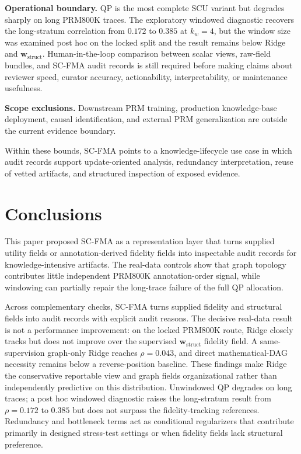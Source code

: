 \documentclass[pdflatex,sn-mathphys-num,iicol]{sn-jnl}
\newcommand{\wstruct}{\ensuremath{\mathbf{w}_{\mathrm{struct}}}}
\begin{document}
\textbf{Operational boundary.} QP is the most complete SCU variant but degrades sharply on long PRM800K traces. The exploratory windowed diagnostic recovers the long-stratum correlation from $0.172$ to $0.385$ at $k_w=4$, but the window size was examined post hoc on the locked split and the result remains below Ridge and \wstruct{}. Human-in-the-loop comparison between scalar views, raw-field bundles, and SC-FMA audit records is still required before making claims about reviewer speed, curator accuracy, actionability, interpretability, or maintenance usefulness.

\medskip
\noindent\textbf{Scope exclusions.} Downstream PRM training, production knowledge-base deployment, causal identification, and external PRM generalization are outside the current evidence boundary.

\noindent Within these bounds, SC-FMA points to a knowledge-lifecycle use case in which audit records support update-oriented analysis, redundancy interpretation, reuse of vetted artifacts, and structured inspection of exposed evidence.

\section{Conclusions}
\label{sec:conclusions}

This paper proposed SC-FMA as a representation layer that turns supplied utility fields or annotation-derived fidelity fields into inspectable audit records for knowledge-intensive artifacts. The real-data controls show that graph topology contributes little independent PRM800K annotation-order signal, while windowing can partially repair the long-trace failure of the full QP allocation.

Across complementary checks, SC-FMA turns supplied fidelity and structural fields into audit records with explicit audit reasons. The decisive real-data result is not a performance improvement: on the locked PRM800K route, Ridge closely tracks but does not improve over the supervised \wstruct{} fidelity field. A same-supervision graph-only Ridge reaches $\rho=0.043$, and direct mathematical-DAG necessity remains below a reverse-position baseline. These findings make Ridge the conservative reportable view and graph fields organizational rather than independently predictive on this distribution. Unwindowed QP degrades on long traces; a post hoc windowed diagnostic raises the long-stratum result from $\rho=0.172$ to $0.385$ but does not surpass the fidelity-tracking references. Redundancy and bottleneck terms act as conditional regularizers that contribute primarily in designed stress-test settings or when fidelity fields lack structural preference.
\end{document}
